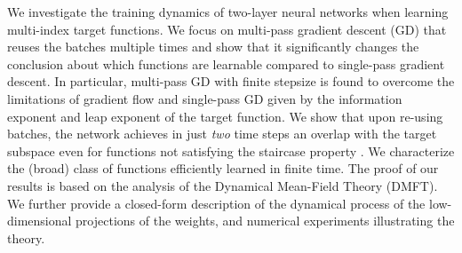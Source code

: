 We investigate the training dynamics of two-layer neural networks when learning multi-index target functions.
%
We focus on multi-pass gradient descent (GD) that reuses the batches multiple times and show that it significantly changes the conclusion about which functions are learnable compared to single-pass gradient descent. 
%
In particular, multi-pass GD with finite stepsize is found to overcome the limitations of gradient flow and single-pass GD given by the information exponent \citep{arous2021online} and leap exponent \citep{abbe2023sgd} of the target function. We show that upon re-using batches, the network achieves in just {\it two} time steps an overlap with the target subspace even for functions not satisfying the staircase property \citep{abbe2021staircase}.
We characterize the (broad) class of functions efficiently learned in finite time.
The proof of our results is based on the analysis of the Dynamical Mean-Field Theory (DMFT). 
%
We further provide a closed-form description of the dynamical process of the low-dimensional projections of the weights, and numerical experiments illustrating the theory.
